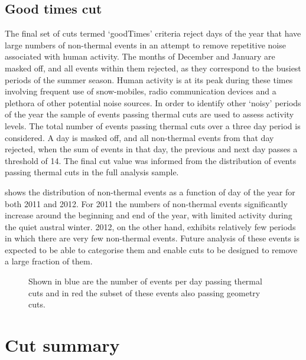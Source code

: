 \subsection{Good times cut}
\label{sec:Analysis:Anthropogenic-Cuts:Good-Times}
The final set of cuts termed `goodTimes' criteria reject days of the year that have large numbers of non-thermal events in an attempt to remove repetitive noise associated with human activity. The months of December and January are masked off, and all events within them rejected, as they correspond to the busiest periods of the summer season. Human activity is at its peak during these times involving frequent use of snow-mobiles, radio communication devices and a plethora of other potential noise sources. In order to identify other `noisy' periods of the year the sample of events passing thermal cuts are used to assess activity levels. The total number of events passing thermal cuts over a three day period is considered. A day is masked off, and all non-thermal events from that day rejected, when the sum of events in that day, the previous and next day passes a threshold of 14. The final cut value was informed from the distribution of events passing thermal cuts in the full analysis sample.

 shows the distribution of non-thermal events as a function of day of the year for both 2011 and 2012. For 2011 the numbers of non-thermal events significantly increase around the beginning and end of the year, with limited activity during the quiet austral winter. 2012, on the other hand, exhibits relatively few periods in which there are very few non-thermal events. Future analysis of these events is expected to be able to categorise them and enable cuts to be designed to remove a large fraction of them.

\begin{figure}[htpb]
\hfill
{}
\caption{Shown in blue are the number of events per day passing thermal cuts and in red the subset of these events also passing geometry cuts.}
\label{fig:Analysis:Anthropogenic-Cuts:GoodTimes:Event-Rate}
\end{figure}

\section{Cut summary}
\label{sec:Analysis:Cut-Summary}

